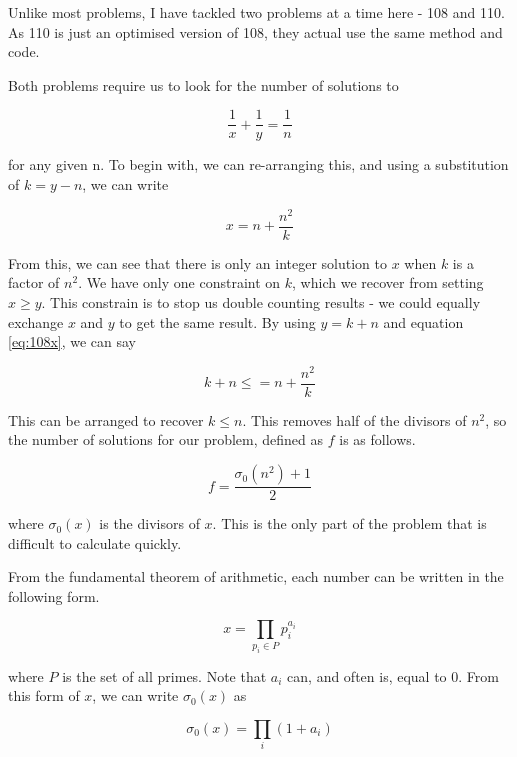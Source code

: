 Unlike most problems, I have tackled two problems at a time here - 108 and 110. As 110 is just an optimised version of 108, they actual use the same method and code.

Both problems require us to look for the number of solutions to 

\begin{equation}
	\label{eq:108prob}
	\dfrac{1}{x} + \dfrac{1}{y} = \dfrac{1}{n}
\end{equation}

for any given n. To begin with, we can re-arranging this, and using a substitution of $k = y - n$, we can write

\begin{equation}
	x = n + \dfrac{n^2}{k}
	\label{eq:108x}
\end{equation}

From this, we can see that there is only an integer solution to $x$ when $k$ is a factor of $n^2$. We have only one constraint on $k$, which we recover from setting $x \geq y$. This constrain is to stop us double counting results - we could equally exchange $x$ and $y$ to get the same result. By using $y = k +n$ and equation \ref{eq:108x}, we can say

\begin{equation}
	k + n \leq = n + \dfrac{n^2}{k}
\end{equation}

This can be arranged to recover $k \leq n$. This removes half of the divisors of $n^2$, so the number of solutions for our problem, defined as $f$ is as follows.

\begin{equation}
	\label{eq:108f}
	f = \dfrac{\sigma_0(n^2) + 1}{2}
\end{equation}

where $\sigma_0(x)$ is the divisors of $x$. This is the only part of the problem that is difficult to calculate quickly.

From the fundamental theorem of arithmetic, each number can be written in the following form.

\begin{equation}
	x = \prod_{p_i \in P} p_i ^{a_i}
\end{equation}

where $P$ is the set of all primes. Note that $a_i$ can, and often is, equal to $0$. From this form of $x$, we can write $\sigma_0(x)$ as

\begin{equation}
	\sigma_0(x) = \prod _i (1 + a_i)
\end{equation}

